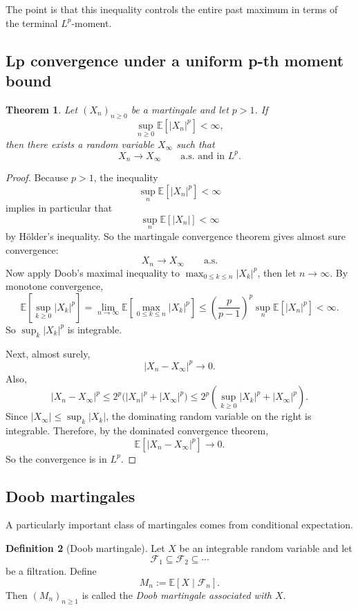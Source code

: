 \documentclass[11pt]{article}
\newtheorem{theorem}{Theorem}[section]
\theoremstyle{definition}
\newtheorem{definition}[theorem]{Definition}
\begin{document}
The point is that this inequality controls the entire past maximum in terms of the terminal \(L^p\)-moment.

\subsection{Lp convergence under a uniform p-th moment bound}

\begin{theorem}
Let \((X_n)_{n\ge 0}\) be a martingale and let \(p>1\). If
\[
\sup_{n\ge 0}\mathbb E[|X_n|^p] < \infty,
\]
then there exists a random variable \(X_\infty\) such that
\[
X_n \to X_\infty
\qquad \text{a.s. and in } L^p.
\]
\end{theorem}

\begin{proof}
Because \(p>1\), the inequality
\[
\sup_n \mathbb E[|X_n|^p] < \infty
\]
implies in particular that
\[
\sup_n \mathbb E[|X_n|] < \infty
\]
by H\"older's inequality. So the martingale convergence theorem gives almost sure convergence:
\[
X_n \to X_\infty \qquad \text{a.s.}
\]
Now apply Doob's maximal inequality to \(\max_{0\le k\le n}|X_k|^p\), then let \(n\to\infty\). By monotone convergence,
\[
\mathbb E\!\left[\sup_{k\ge 0}|X_k|^p\right]
=
\lim_{n\to\infty}
\mathbb E\!\left[\max_{0\le k\le n}|X_k|^p\right]
\le
\left(\frac{p}{p-1}\right)^p
\sup_n \mathbb E[|X_n|^p]
<\infty.
\]
So \(\sup_k |X_k|^p\) is integrable.

Next, almost surely,
\[
|X_n-X_\infty|^p \to 0.
\]
Also,
\[
|X_n-X_\infty|^p
\le 2^p\bigl(|X_n|^p+|X_\infty|^p\bigr)
\le 2^p\left(\sup_{k\ge 0}|X_k|^p + |X_\infty|^p\right).
\]
Since \(|X_\infty|\le \sup_k |X_k|\), the dominating random variable on the right is integrable. Therefore, by the dominated convergence theorem,
\[
\mathbb E[|X_n-X_\infty|^p] \to 0.
\]
So the convergence is in \(L^p\).
\end{proof}

\subsection{Doob martingales}

A particularly important class of martingales comes from conditional expectation.

\begin{definition}[Doob martingale]
Let \(X\) be an integrable random variable and let
\[
\mathcal F_1 \subseteq \mathcal F_2 \subseteq \cdots
\]
be a filtration. Define
\[
M_n := \mathbb E[X\mid \mathcal F_n].
\]
Then \((M_n)_{n\ge 1}\) is called the \emph{Doob martingale associated with \(X\)}.
\end{definition}
\end{document}

